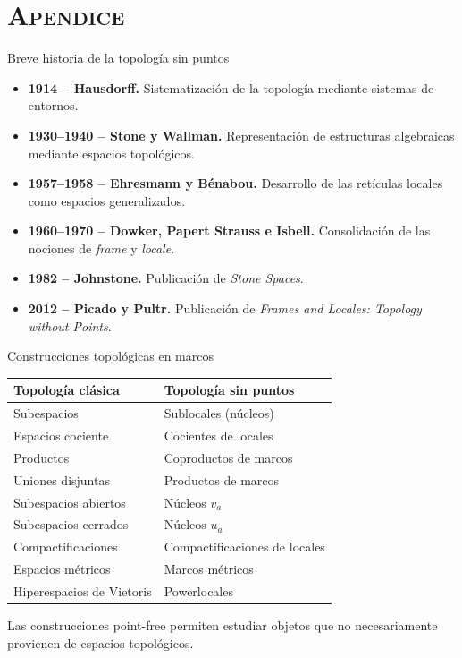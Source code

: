 \documentclass[compress,12pt]{beamer}
\begin{document}
\section*{\textsc{Apendice}}
\begin{frame}{Breve historia de la topología sin puntos}
\small

\begin{itemize}
    \setlength{\itemsep}{0.65em}

    \item \textbf{1914 -- Hausdorff.}
    Sistematización de la topología mediante
    sistemas de entornos.

    \item \textbf{1930--1940 -- Stone y Wallman.}
    Representación de estructuras algebraicas
    mediante espacios topológicos.

    \item \textbf{1957--1958 -- Ehresmann y Bénabou.}
    Desarrollo de las retículas locales como
    espacios generalizados.

    \item \textbf{1960--1970 -- Dowker, Papert Strauss e Isbell.}
    Consolidación de las nociones de
    \emph{frame} y \emph{locale}.

    \item \textbf{1982 -- Johnstone.}
    Publicación de \emph{Stone Spaces}.

    \item \textbf{2012 -- Picado y Pultr.}
    Publicación de \emph{Frames and Locales:
    Topology without Points}.
\end{itemize}

\end{frame}


\begin{frame}{Construcciones topológicas en marcos}
\small

\begin{center}
\renewcommand{\arraystretch}{1.4}
\begin{tabular}{ll}
\hline
\textbf{Topología clásica}
&
\textbf{Topología sin puntos}
\\
\hline
Subespacios
&
Sublocales (núcleos)
\\
Espacios cociente
&
Cocientes de locales
\\
Productos
&
Coproductos de marcos
\\
Uniones disjuntas
&
Productos de marcos
\\
Subespacios abiertos
&
Núcleos $v_a$
\\
Subespacios cerrados
&
Núcleos $u_a$
\\
Compactificaciones
&
Compactificaciones de locales
\\
Espacios métricos
&
Marcos métricos
\\
Hiperespacios de Vietoris
&
Powerlocales
\\
\hline
\end{tabular}
\end{center}

Las construcciones point-free permiten
estudiar objetos que no necesariamente
provienen de espacios topológicos.

\end{frame}
\end{document}
